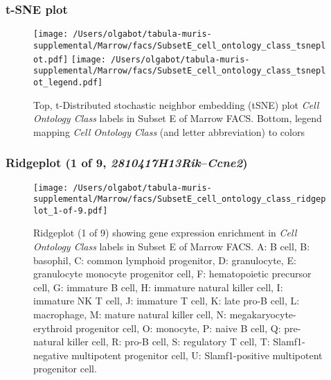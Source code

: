 \clearpage
\subsubsection{t-SNE plot}
\begin{figure}[h]
\centering
\texttt{[image: /Users/olgabot/tabula-muris-supplemental/Marrow/facs/SubsetE\_cell\_ontology\_class\_tsneplot.pdf]}
\texttt{[image: /Users/olgabot/tabula-muris-supplemental/Marrow/facs/SubsetE\_cell\_ontology\_class\_tsneplot\_legend.pdf]}
\caption{Top, t-Distributed stochastic neighbor embedding (tSNE) plot  \emph{Cell Ontology Class} labels in Subset E of Marrow FACS. Bottom, legend mapping \emph{Cell Ontology Class} (and letter abbreviation) to colors}
\end{figure}


\clearpage

\subsubsection{Ridgeplot (1 of 9, \emph{2810417H13Rik}--\emph{Ccne2})}
\begin{figure}[h]
\centering
\texttt{[image: /Users/olgabot/tabula-muris-supplemental/Marrow/facs/SubsetE\_cell\_ontology\_class\_ridgeplot\_1-of-9.pdf]}

\caption{ Ridgeplot (1 of 9)  showing gene expression enrichment in \emph{Cell Ontology Class} labels in Subset E of Marrow FACS. A: B cell, B: basophil, C: common lymphoid progenitor, D: granulocyte, E: granulocyte monocyte progenitor cell, F: hematopoietic precursor cell, G: immature B cell, H: immature natural killer cell, I: immature NK T cell, J: immature T cell, K: late pro-B cell, L: macrophage, M: mature natural killer cell, N: megakaryocyte-erythroid progenitor cell, O: monocyte, P: naive B cell, Q: pre-natural killer cell, R: pro-B cell, S: regulatory T cell, T: Slamf1-negative multipotent progenitor cell, U: Slamf1-positive multipotent progenitor cell.}
\end{figure}


\clearpage

